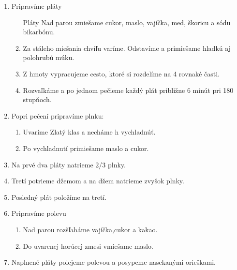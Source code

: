 \begin{recipe}

\begin{enumerate}

\item{Pripravíme pláty}
\begin{enumerate}
\item[Pláty]{Nad parou zmiešame cukor, maslo, vajíčka, med, škoricu a sódu bikarbónu.}
\item{Za stáleho miešania chvíľu varíme. Odstavíme a primiešame hladkú aj polohrubú múku. }
\item{Z hmoty vypracujeme cesto, ktoré si rozdelíme na 4 rovnaké časti.}
\item{Rozvaľkáme a po jednom pečieme každý plát približne 6 minút pri 180 stupňoch. }
\end{enumerate}

\item{Popri pečení pripravíme plnku:}
\begin{enumerate}
\item{Uvaríme Zlatý klas a necháme h vychladnúť.}
\item{Po vychladnutí primiešame maslo a cukor.}
\end{enumerate}

\item{Na prvé dva pláty natrieme 2/3 plnky.}
\item{Tretí potrieme džemom a na džem natrieme zvyšok plnky.}
\item{Posledný plát položíme na tretí.}

\item{Pripravíme polevu}
\begin{enumerate}
\item{Nad parou rozšľaháme vajíčka,cukor a kakao.}
\item{Do uvarenej horúcej zmesi vmiešame maslo.}
\end{enumerate}
\item{Naplnené pláty polejeme polevou a posypeme nasekanými orieškami.}


\end{enumerate}
\end{recipe}


\clearpage	

